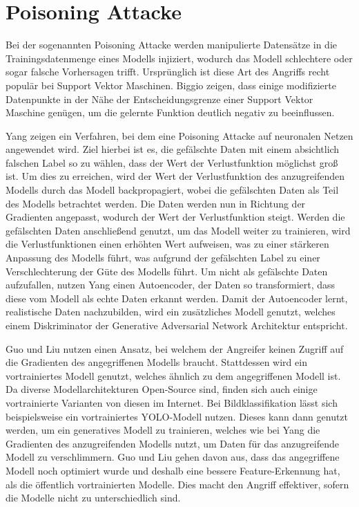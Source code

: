 \section{Poisoning Attacke}\label{sec:poisoning}

Bei der sogenannten Poisoning Attacke werden manipulierte Datensätze in die Trainingsdatenmenge eines Modells injiziert, wodurch das Modell schlechtere oder sogar falsche Vorhersagen trifft.
Ursprünglich ist diese Art des Angriffs recht populär bei Support Vektor Maschinen.
Biggio \etal \cite{P-15} zeigen, dass einige modifizierte Datenpunkte in der Nähe der Entscheidungsgrenze einer Support Vektor Maschine genügen, um die gelernte Funktion deutlich negativ zu beeinflussen.

Yang \etal \cite{P-17} zeigen ein Verfahren, bei dem eine Poisoning Attacke auf neuronalen Netzen angewendet wird.
Ziel hierbei ist es, die gefälschte Daten mit einem absichtlich falschen Label so zu wählen, dass der Wert der Verlustfunktion möglichst groß ist. 
Um dies zu erreichen, wird der Wert der Verlustfunktion des anzugreifenden Modells durch das Modell backpropagiert, wobei die gefälschten Daten als Teil des Modells betrachtet werden. 
Die Daten werden nun in Richtung der Gradienten angepasst, wodurch der Wert der Verlustfunktion steigt.
Werden die gefälschten Daten anschließend genutzt, um das Modell weiter zu trainieren, wird die Verlustfunktionen einen erhöhten Wert aufweisen, was zu einer stärkeren Anpassung des Modells führt, was aufgrund der gefälschten Label zu einer Verschlechterung der Güte des Modells führt.
Um nicht als gefälschte Daten aufzufallen, nutzen Yang \etal \cite{P-17} einen Autoencoder, der Daten so transformiert, dass diese vom Modell als echte Daten erkannt werden.
Damit der Autoencoder lernt, realistische Daten nachzubilden, wird ein zusätzliches Modell genutzt, welches einem Diskriminator der Generative Adversarial Network Architektur \cite{P-86} entspricht.

Guo und Liu \cite{P-16} nutzen einen Ansatz, bei welchem der Angreifer keinen Zugriff auf die Gradienten des angegriffenen Modells braucht.
Stattdessen wird ein vortrainiertes Modell genutzt, welches ähnlich zu dem angegriffenen Modell ist. 
Da diverse Modellarchitekturen Open-Source sind, finden sich auch einige vortrainierte Varianten von diesen im Internet.
Bei Bildklassifikation lässt sich beispielsweise ein vortrainiertes YOLO-Modell nutzen.
Dieses kann dann genutzt werden, um ein generatives Modell zu trainieren, welches wie bei Yang \etal \cite{P-17} die Gradienten des anzugreifenden Modells nutzt, um Daten für das anzugreifende Modell zu verschlimmern.
Guo und Liu \cite{P-16} gehen davon aus, dass das angegriffene Modell noch optimiert wurde und deshalb eine bessere Feature-Erkennung hat, als die öffentlich vortrainierten Modelle.
Dies macht den Angriff effektiver, sofern die Modelle nicht zu unterschiedlich sind.


